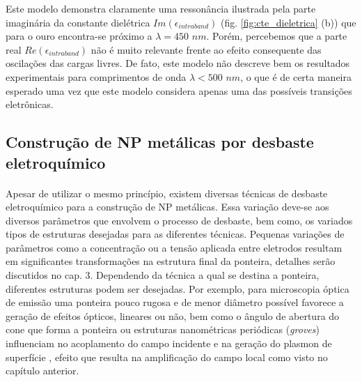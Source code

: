Este modelo demonstra claramente uma ressonância ilustrada pela parte imaginária da constante dielétrica $Im(\epsilon_{intraband})$ (fig. \ref{fig:cte_dieletrica} (b)) que para o ouro encontra-se próximo a $\lambda=450\,\,nm$. Porém, percebemos que a parte real $Re(\epsilon_{intraband})$ não é muito relevante frente ao efeito consequente das oscilações das cargas livres. De fato, este modelo não descreve bem os resultados experimentais para comprimentos de onda $\lambda < 500\,\,nm$, o que é de certa maneira esperado uma vez que este modelo considera apenas uma das possíveis transições eletrônicas. 


\subsection{Construção de NP metálicas por desbaste eletroquímico}
\paragraph*{}

Apesar de utilizar o mesmo princípio, existem diversas técnicas de desbaste eletroquímico para a construção de NP metálicas. Essa variação deve-se aos diversos parâmetros que envolvem o processo de desbaste, bem como, os variados tipos de estruturas desejadas para as diferentes técnicas. Pequenas variações de parâmetros como a concentração ou a tensão aplicada entre eletrodos resultam em significantes transformações na estrutura final da ponteira, detalhes serão discutidos no cap. 3. Dependendo da técnica a qual se destina a ponteira, diferentes estruturas podem ser desejadas. Por exemplo, para microscopia óptica de emissão uma ponteira pouco rugosa e de menor diâmetro possível favorece a geração de efeitos ópticos, lineares ou não, bem como o ângulo de abertura do cone que forma a ponteira ou estruturas nanométricas periódicas (\textit{groves}) influenciam no acoplamento do campo incidente e na geração do plasmon de superfície \cite{boyle,zayats,principle}, efeito que resulta na amplificação do campo local como visto no capítulo anterior.

